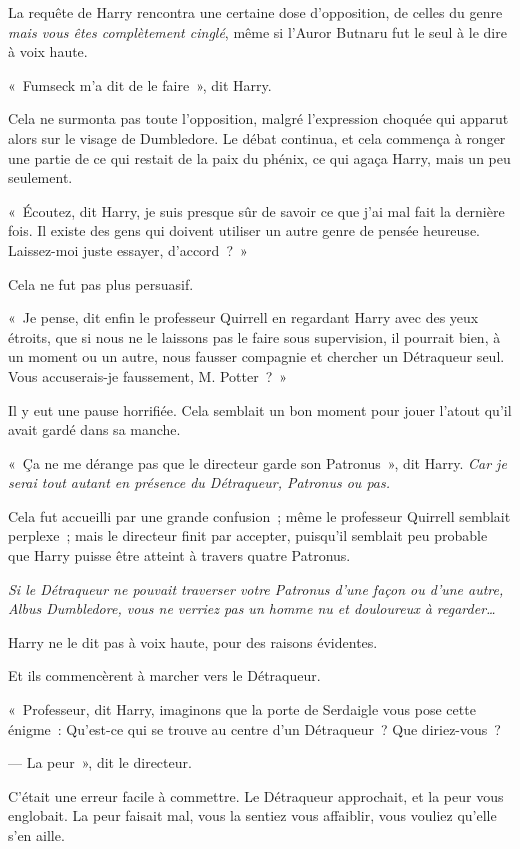 \later

La requête de Harry rencontra une certaine dose d'opposition, de celles du genre \emph{mais vous êtes complètement cinglé}, même si l'Auror Butnaru fut le seul à le dire à voix haute.

«~Fumseck m'a dit de le faire~», dit Harry.

Cela ne surmonta pas toute l'opposition, malgré l'expression choquée qui apparut alors sur le visage de Dumbledore.
Le débat continua, et cela commença à ronger une partie de ce qui restait de la paix du phénix, ce qui agaça Harry, mais un peu seulement.

«~Écoutez, dit Harry, je suis presque sûr de savoir ce que j'ai mal fait la dernière fois.
Il existe des gens qui doivent utiliser un autre genre de pensée heureuse.
Laissez-moi juste essayer, d'accord~?~»

Cela ne fut pas plus persuasif.

«~Je pense, dit enfin le professeur Quirrell en regardant Harry avec des yeux étroits, que si nous ne le laissons pas le faire sous supervision, il pourrait bien, à un moment ou un autre, nous fausser compagnie et chercher un Détraqueur seul.
Vous accuserais-je faussement, M. Potter~?~»

Il y eut une pause horrifiée.
Cela semblait un bon moment pour jouer l'atout qu'il avait gardé dans sa manche.

«~Ça ne me dérange pas que le directeur garde son Patronus~», dit Harry.
\emph{Car je serai tout autant en présence du Détraqueur, Patronus ou pas.}

Cela fut accueilli par une grande confusion~; même le professeur Quirrell semblait perplexe~; mais le directeur finit par accepter, puisqu'il semblait peu probable que Harry puisse être atteint à travers quatre Patronus.

\emph{Si le Détraqueur ne pouvait traverser votre Patronus d'une façon ou d'une autre, Albus Dumbledore, vous ne verriez pas un homme nu et douloureux à regarder…}

Harry ne le dit pas à voix haute, pour des raisons évidentes.

Et ils commencèrent à marcher vers le Détraqueur.

«~Professeur, dit Harry, imaginons que la porte de Serdaigle vous pose cette énigme~: Qu'est-ce qui se trouve au centre d'un Détraqueur~?
Que diriez-vous~?

--- La peur~», dit le directeur.

C'était une erreur facile à commettre.
Le Détraqueur approchait, et la peur vous englobait.
La peur faisait mal, vous la sentiez vous affaiblir, vous vouliez qu'elle s'en aille.


